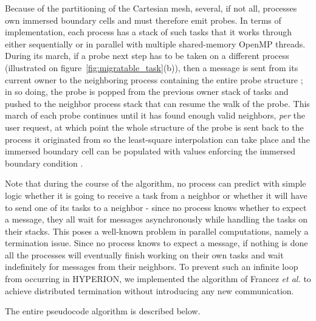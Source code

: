 Because of the partitioning of the Cartesian mesh, several, if not all, processes own immersed boundary cells and must therefore emit probes.
In terms of implementation, each process has a stack of such tasks that it works through either sequentially or in parallel with multiple shared-memory OpenMP threads.
During its march, if a probe next step has to be taken on a different process (illustrated on figure~\ref{fig:migratable_task}(b)), then a message is sent from its current owner to the neighboring process containing the entire probe structure ; in so doing, the probe is popped from the previous owner stack of tasks and pushed to the neighbor process stack that can resume the walk of the probe.
This march of each probe continues until it has found enough valid neighbors, \emph{per} the user request, at which point the whole structure of the probe is sent back to the process it originated from so the least-square interpolation can take place and the immersed boundary cell can be populated with values enforcing the immersed boundary condition \cite{BRIDELBERTOMEU2021}.

Note that during the course of the algorithm, no process can predict with simple logic whether it is going to receive a task from a neighbor or whether it will have to send one of its tasks to a neighbor - since no process knows whether to expect a message, they all wait for messages asynchronously while handling the tasks on their stacks.
This poses a well-known problem in parallel computations, namely a termination issue.
Since no process knows to expect a message, if nothing is done all the processes will eventually finish working on their own tasks and wait indefinitely for messages from their neighbors.
To prevent such an infinite loop from occurring in HYPERION, we implemented the algorithm of Francez \emph{et al.} \cite{francez1982} to achieve distributed termination without introducing any new communication.

The entire pseudocode algorithm is described below.

